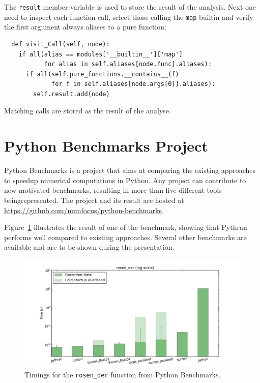 \documentclass{llncs}
\begin{document}
The \texttt{result} member variable is used to store the result of the
analysis. Next one need to inspect each function call, select those calling the
\texttt{map} builtin and verify the first argument always aliases to a pure
function:

\begin{lstlisting}
  def visit_Call(self, node):
    if all(alias == modules['__builtin__']['map']
           for alias in self.aliases[node.func].aliases):
      if all(self.pure_functions.__contains__(f)
             for f in self.aliases[node.args[0]].aliases):
        self.result.add(node)
\end{lstlisting}

Matching calls are stored as the result of the analyse.

\section{Python Benchmarks Project}
\label{sec:python-benchmarks}

Python Benchmarks is a project that aims at comparing the existing approaches
to speedup numerical computations in Python. Any project can contribute to new
motivated benchmarks, resulting in more than five different tools
beingrepresented. The project and its result are hosted at
\url{https://github.com/numfocus/python-benchmarks}.

Figure~\ref{fig:python-benchmarks} illustrates the result of one of the
benchmark, showing that Pythran performs well compared to existing approaches.
Several other benchmarks are available and are to be shown during the
presentation.

\begin{figure}[ht]
    \vspace{-2em}
    \hspace{-.05\textwidth}
    \includegraphics[width=1.1\textwidth]{rosen_der_logscale}
    \caption{Timings for the \texttt{rosen\_der} function from Python Benchmarks.}
    \label{fig:python-benchmarks}
    \vspace{-2em}

\end{figure}
\end{document}
